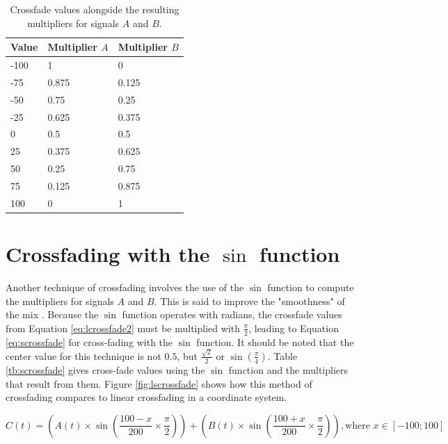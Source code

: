 \documentclass[12pt,twoside]{report}
\begin{document}
\begin{table}[h!]

  \centering

  \begin{tabular}[]{| l | l | l |}
    \hline
    \rowcolor[gray]{0.8}
    Value & Multiplier $A$ & Multiplier $B$ \\\hline
    -100 & 1 & 0\\\hline
    -75 & 0.875 & 0.125\\\hline
    -50 & 0.75 & 0.25\\\hline
    -25 & 0.625 & 0.375\\\hline
    0 & 0.5 & 0.5\\\hline
    25 & 0.375 & 0.625\\\hline
    50 & 0.25 & 0.75\\\hline
    75 & 0.125 & 0.875\\\hline
    100 & 0 & 1\\
    \hline
  \end{tabular}

  \caption{Crossfade values alongside the resulting multipliers for signals $A$ and $B$.}

  \label{tb:lcrossfade}

\end{table}

\section{Crossfading with the $\sin$ function}

Another technique of crossfading involves the use of the $\sin$ function to compute the multipliers for signals $A$ and $B$. This is said to improve the "smoothness" of the mix . Because the $\sin$ function operates with radians, the crossfade values from Equation \ref{eq:lcrossfade2} must be multiplied with $\frac{\pi}{2}$, leading to Equation \ref{eq:scrossfade} for cross-fading with the $\sin$ function. It should be noted that the center value for this technique is not $0.5$, but $\frac{\sqrt{2}}{2}$ or $\sin(\frac{\pi}{4})$. Table \ref{tb:scrossfade} gives cross-fade values using the $\sin$ function and the multipliers that result from them. Figure \ref{fig:lscrossfade} shows how this method of crossfading compares to linear crossfading in a coordinate system.

\begin{equation}
  C(t) = (A(t) \times \sin(\frac{100 - x}{200} \times \frac{\pi}{2})) + (B(t) \times \sin(\frac{100 + x}{200} \times \frac{\pi}{2})), \text{where } x \in [-100;100]
  \label{eq:scrossfade}
\end{equation}
\end{document}

